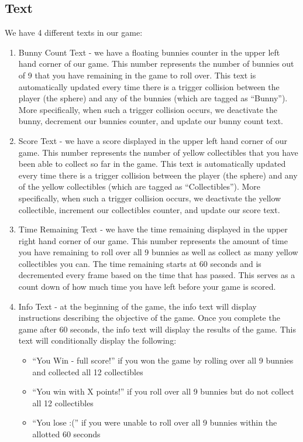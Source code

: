 \documentclass[12pt]{article}
\begin{document}
\subsection{Text}

We have 4 different texts in our game:

\begin{enumerate}
  \item Bunny Count Text - we have a floating bunnies counter in the upper left hand corner of our game. This number represents the number of bunnies out of 9 that you have remaining in the game to roll over. This text is automatically updated every time there is a trigger collision between the player (the sphere) and any of the bunnies (which are tagged as ``Bunny''). More specifically, when such a trigger collision occurs, we deactivate the bunny, decrement our bunnies counter, and update our bunny count text.
  \item Score Text - we have a score displayed in the upper left hand corner of our game. This number represents the number of yellow collectibles that you have been able to collect so far in the game. This text is automatically updated every time there is a trigger collision between the player (the sphere) and any of the yellow collectibles (which are tagged as ``Collectibles''). More specifically, when such a trigger collision occurs, we deactivate the yellow collectible, increment our collectibles counter, and update our score text.
  \item Time Remaining Text - we have the time remaining displayed in the upper right hand corner of our game. This number represents the amount of time you have remaining to roll over all 9 bunnies as well as collect as many yellow collectibles you can. The time remaining starts at 60 seconds and is decremented every frame based on the time that has passed. This serves as a count down of how much time you have left before your game is scored.
  \item Info Text - at the beginning of the game, the info text will display instructions describing the objective of the game. Once you complete the game after 60 seconds, the info text will display the results of the game. This text will conditionally display the following:
  \begin{itemize}
    \item ``You Win - full score!'' if you won the game by rolling over all 9 bunnies and collected all 12 collectibles
    \item ``You win with X points!'' if you roll over all 9 bunnies but do not collect all 12 collectibles
    \item ``You lose :('' if you were unable to roll over all 9 bunnies within the allotted 60 seconds
  \end{itemize}
\end{enumerate}
\end{document}
